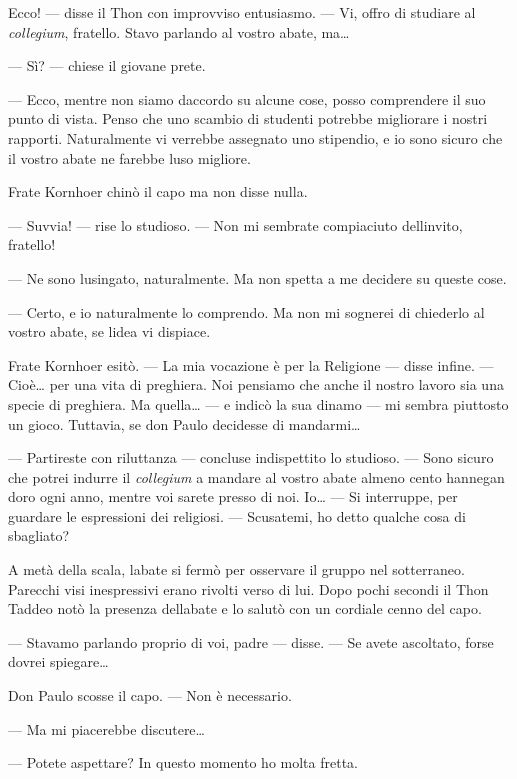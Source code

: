 Ecco! --- disse il Thon con improvviso entusiasmo. --- Vi, offro di
studiare al \emph{collegium}, fratello. Stavo parlando al vostro abate,
ma\ldots{}

--- Sì? --- chiese il giovane prete.

--- Ecco, mentre non siamo d\textquotesingle accordo su alcune cose,
posso comprendere il suo punto di vista. Penso che uno scambio di
studenti potrebbe migliorare i nostri rapporti. Naturalmente vi verrebbe
assegnato uno stipendio, e io sono sicuro che il vostro abate ne farebbe
l\textquotesingle uso migliore.

Frate Kornhoer chinò il capo ma non disse nulla.

--- Suvvia! --- rise lo studioso. --- Non mi sembrate compiaciuto
dell\textquotesingle invito, fratello!

--- Ne sono lusingato, naturalmente. Ma non spetta a me decidere su
queste cose.

--- Certo, e io naturalmente lo comprendo. Ma non mi sognerei di
chiederlo al vostro abate, se l\textquotesingle idea vi dispiace.

Frate Kornhoer esitò. --- La mia vocazione è per la Religione --- disse
infine. --- Cioè\ldots{} per una vita di preghiera. Noi pensiamo che
anche il nostro lavoro sia una specie di preghiera. Ma quella\ldots{}
--- e indicò la sua dinamo --- mi sembra piuttosto un gioco. Tuttavia,
se don Paulo decidesse di mandarmi\ldots{}

--- Partireste con riluttanza --- concluse indispettito lo studioso. ---
Sono sicuro che potrei indurre il \emph{collegium} a mandare al vostro
abate almeno cento hannegan d\textquotesingle oro ogni anno, mentre voi
sarete presso di noi. Io\ldots{} --- Si interruppe, per guardare le
espressioni dei religiosi. --- Scusatemi, ho detto qualche cosa di
sbagliato?

A metà della scala, l\textquotesingle abate si fermò per osservare il
gruppo nel sotterraneo. Parecchi visi inespressivi erano rivolti verso
di lui. Dopo pochi secondi il Thon Taddeo notò la presenza
dell\textquotesingle abate e lo salutò con un cordiale cenno del capo.

--- Stavamo parlando proprio di voi, padre --- disse. --- Se avete
ascoltato, forse dovrei spiegare\ldots{}

Don Paulo scosse il capo. --- Non è necessario.

--- Ma mi piacerebbe discutere\ldots{}

--- Potete aspettare? In questo momento ho molta fretta.

